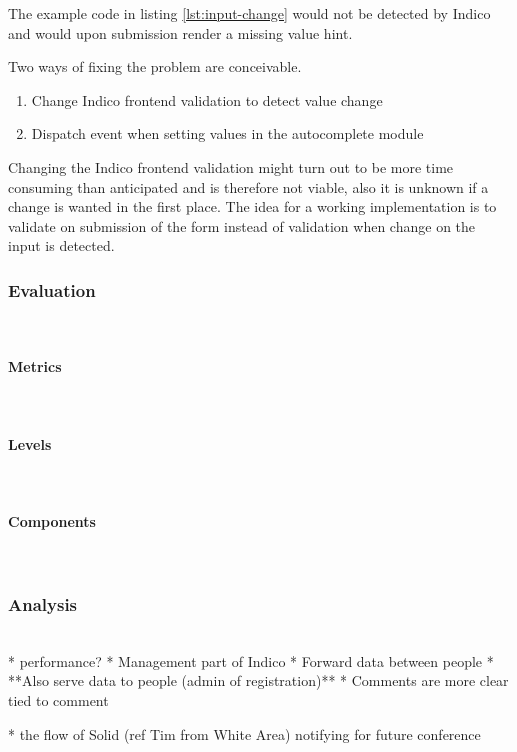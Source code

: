 The example code in listing \ref{lst:input-change} would not be detected by Indico and would upon submission render a missing value hint.

Two ways of fixing the problem are conceivable.

\begin{enumerate}
    \item Change Indico frontend validation to detect value change
    \item Dispatch event when setting values in the autocomplete module
\end{enumerate}

Changing the Indico frontend validation might turn out to be more time consuming than anticipated and is therefore not viable, also it is unknown if a change is wanted in the first place. The idea for a working implementation is to validate on submission of the form instead of validation when change on the input is detected. 

\subsubsection{Evaluation}\mbox{}\\

\paragraph{Metrics}\mbox{}\\
\paragraph{Levels}\mbox{}\\
\paragraph{Components}\mbox{}\\

\subsubsection{Analysis}\mbox{}\\

* performance?
* Management part of Indico
  * Forward data between people
  * **Also serve data to people (admin of registration)**
* Comments are more clear tied to comment

* the flow of Solid (ref Tim from White Area) notifying for future conference